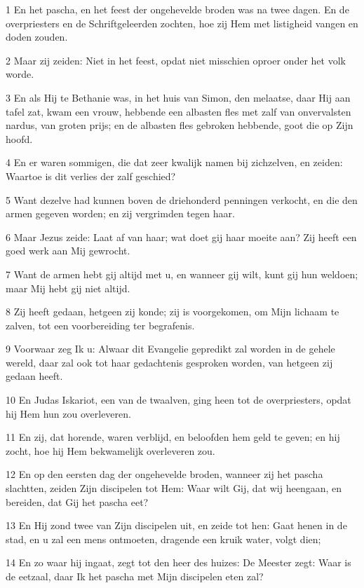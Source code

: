 \par 1 En het pascha, en het feest der ongehevelde broden was na twee dagen. En de overpriesters en de Schriftgeleerden zochten, hoe zij Hem met listigheid vangen en doden zouden.
\par 2 Maar zij zeiden: Niet in het feest, opdat niet misschien oproer onder het volk worde.
\par 3 En als Hij te Bethanie was, in het huis van Simon, den melaatse, daar Hij aan tafel zat, kwam een vrouw, hebbende een albasten fles met zalf van onvervalsten nardus, van groten prijs; en de albasten fles gebroken hebbende, goot die op Zijn hoofd.
\par 4 En er waren sommigen, die dat zeer kwalijk namen bij zichzelven, en zeiden: Waartoe is dit verlies der zalf geschied?
\par 5 Want dezelve had kunnen boven de driehonderd penningen verkocht, en die den armen gegeven worden; en zij vergrimden tegen haar.
\par 6 Maar Jezus zeide: Laat af van haar; wat doet gij haar moeite aan? Zij heeft een goed werk aan Mij gewrocht.
\par 7 Want de armen hebt gij altijd met u, en wanneer gij wilt, kunt gij hun weldoen; maar Mij hebt gij niet altijd.
\par 8 Zij heeft gedaan, hetgeen zij konde; zij is voorgekomen, om Mijn lichaam te zalven, tot een voorbereiding ter begrafenis.
\par 9 Voorwaar zeg Ik u: Alwaar dit Evangelie gepredikt zal worden in de gehele wereld, daar zal ook tot haar gedachtenis gesproken worden, van hetgeen zij gedaan heeft.
\par 10 En Judas Iskariot, een van de twaalven, ging heen tot de overpriesters, opdat hij Hem hun zou overleveren.
\par 11 En zij, dat horende, waren verblijd, en beloofden hem geld te geven; en hij zocht, hoe hij Hem bekwamelijk overleveren zou.
\par 12 En op den eersten dag der ongehevelde broden, wanneer zij het pascha slachtten, zeiden Zijn discipelen tot Hem: Waar wilt Gij, dat wij heengaan, en bereiden, dat Gij het pascha eet?
\par 13 En Hij zond twee van Zijn discipelen uit, en zeide tot hen: Gaat henen in de stad, en u zal een mens ontmoeten, dragende een kruik water, volgt dien;
\par 14 En zo waar hij ingaat, zegt tot den heer des huizes: De Meester zegt: Waar is de eetzaal, daar Ik het pascha met Mijn discipelen eten zal?
